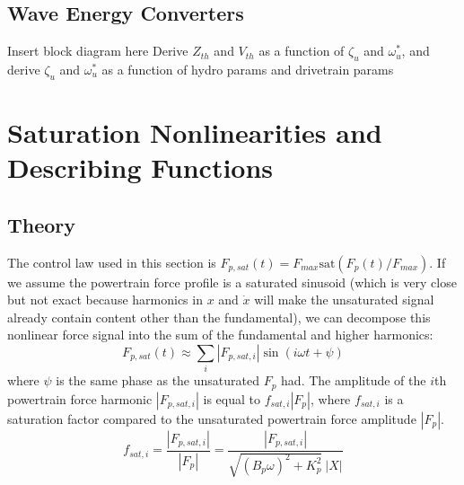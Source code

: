 \documentclass{ifacconf}
\begin{document}



\subsection{Wave Energy Converters}
Insert block diagram here
Derive $Z_{th}$ and $V_{th}$ as a function of $\zeta_u$ and $\omega_u^*$, and derive $\zeta_u$ and $\omega_u^*$ as a function of hydro params and drivetrain params 


\section{Saturation Nonlinearities and Describing Functions}\label{sec:nonlinear}

\subsection{Theory}
The control law used in this section is $F_{p,sat}(t) = F_{max}\textrm{sat}(F_p(t)/F_{max})$. If we assume the powertrain force profile is a saturated sinusoid (which is very close but not exact because harmonics in $x$ and $\dot{x}$ will make the unsaturated signal already contain content other than the fundamental), we can decompose this nonlinear force signal into the sum of the fundamental and higher harmonics: 
\begin{equation}
    F_{p,sat}(t) \approx \sum_i |F_{p,sat,i}| \sin(i \omega t + \psi)
\end{equation} where $\psi$ is the same phase as the unsaturated $F_p$ had. The amplitude of the $i$th powertrain force harmonic $|F_{p,sat,i}|$ is equal to $f_{sat,i} |F_p|$, where $f_{sat,i}$ is a saturation factor compared to the unsaturated powertrain force amplitude $|F_p|$.
\begin{equation}\label{f-sat-i-defn}
    f_{sat,i} = \frac{|F_{p,sat,i}|}{|F_p|} = \frac{|F_{p,sat,i}|}{\sqrt{(B_p\omega)^2+K_p^2}~|X|}
\end{equation}
\end{document}

